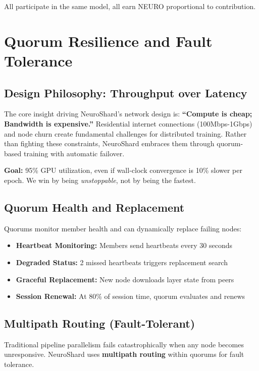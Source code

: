 \documentclass[11pt,a4paper]{article}
\begin{document}
All participate in the same model, all earn NEURO proportional to contribution.

\section{Quorum Resilience and Fault Tolerance}

\subsection{Design Philosophy: Throughput over Latency}

The core insight driving NeuroShard's network design is: \textbf{``Compute is cheap; Bandwidth is expensive.''} Residential internet connections (100Mbps-1Gbps) and node churn create fundamental challenges for distributed training. Rather than fighting these constraints, NeuroShard embraces them through quorum-based training with automatic failover.

\textbf{Goal:} 95\% GPU utilization, even if wall-clock convergence is 10\% slower per epoch. We win by being \textit{unstoppable}, not by being the fastest.

\subsection{Quorum Health and Replacement}

Quorums monitor member health and can dynamically replace failing nodes:
\begin{itemize}
    \item \textbf{Heartbeat Monitoring:} Members send heartbeats every 30 seconds
    \item \textbf{Degraded Status:} 2 missed heartbeats triggers replacement search
    \item \textbf{Graceful Replacement:} New node downloads layer state from peers
    \item \textbf{Session Renewal:} At 80\% of session time, quorum evaluates and renews
\end{itemize}

\subsection{Multipath Routing (Fault-Tolerant)}

Traditional pipeline parallelism fails catastrophically when any node becomes unresponsive. NeuroShard uses \textbf{multipath routing} within quorums for fault tolerance.
\end{document}
